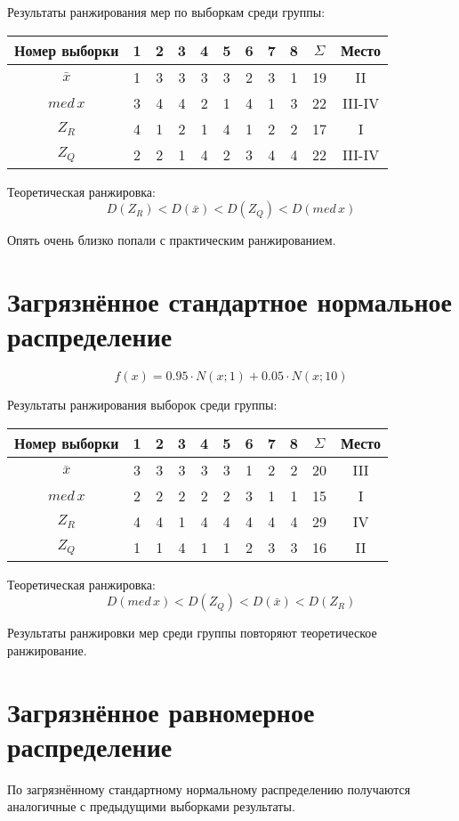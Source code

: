 \documentclass{article} %
\begin{document}
Результаты ранжирования мер по выборкам среди группы:
\begin{center}
	\begin{tabular}{|c| c|c|c|c|c|c|c|c| c|c|} \hline
		Номер выборки & 1 & 2 & 3 & 4 & 5 & 6 & 7 & 8 & \(\Sigma\) & Место \\ \hline
		\(\bar{x}\)   & 1 & 3 & 3 & 3 & 3 & 2 & 3 & 1 & 19 & II \\ \hline
		\(med \, x\)  & 3 & 4 & 4 & 2 & 1 & 4 & 1 & 3 & 22 & III-IV \\ \hline
		\(Z_R\)       & 4 & 1 & 2 & 1 & 4 & 1 & 2 & 2 & 17 & I \\ \hline
		\(Z_Q\)       & 2 & 2 & 1 & 4 & 2 & 3 & 4 & 4 & 22 & III-IV \\ \hline
	\end{tabular}
\end{center}

Теоретическая ранжировка:
\[ D(Z_R) < D(\bar{x}) < D(Z_Q) < D(med \, x) \]

Опять очень близко попали с практическим ранжированием.

\section{Загрязнённое стандартное нормальное распределение}
\[ f(x) = 0.95 \cdot N(x;1) + 0.05 \cdot N(x;10)\]

Результаты ранжирования выборок среди группы:
\begin{center}
	\begin{tabular}{|c| c|c|c|c|c|c|c|c| c|c|} \hline
		Номер выборки & 1 & 2 & 3 & 4 & 5 & 6 & 7 & 8 & \(\Sigma\) & Место \\ \hline
		\(\bar{x}\)   & 3 & 3 & 3 & 3 & 3 & 1 & 2 & 2 & 20 & III \\ \hline
		\(med \, x\)  & 2 & 2 & 2 & 2 & 2 & 3 & 1 & 1 & 15 & I \\ \hline
		\(Z_R\)       & 4 & 4 & 1 & 4 & 4 & 4 & 4 & 4 & 29 & IV \\ \hline
		\(Z_Q\)       & 1 & 1 & 4 & 1 & 1 & 2 & 3 & 3 & 16 & II \\ \hline
	\end{tabular}
\end{center}

Теоретическая ранжировка:
\[ D(med \, x) < D(Z_Q) < D(\bar{x}) < D(Z_R) \]

Результаты ранжировки мер среди группы повторяют теоретическое ранжирование.

\section{Загрязнённое равномерное распределение}
По загрязнённому стандартному нормальному распределению получаются аналогичные с предыдущими выборками результаты.
\end{document}
